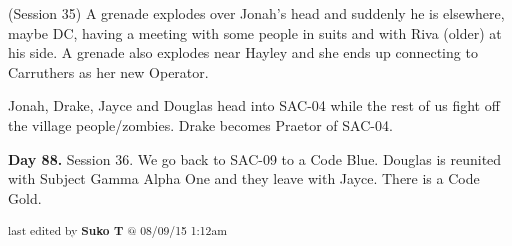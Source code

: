 (Session 35) A grenade explodes over Jonah's head and suddenly he is elsewhere, maybe DC, having a meeting with some people in suits and with Riva (older) at his side.  A grenade also explodes near Hayley and she ends up connecting to Carruthers as her new Operator.   

Jonah, Drake, Jayce and Douglas head into SAC-04 while the rest of us fight off the village people/zombies.  Drake becomes Praetor of SAC-04.

\textbf{Day 88.}  Session 36. We go back to SAC-09 to a Code Blue.  Douglas is reunited with Subject Gamma Alpha One and they leave with Jayce.  There is a Code Gold. 
\vspace{\fill}

\begin{flushright}
\textsubscript{last edited by \textbf{Suko T} @ 08/09/15 1:12am}
\end{flushright}

